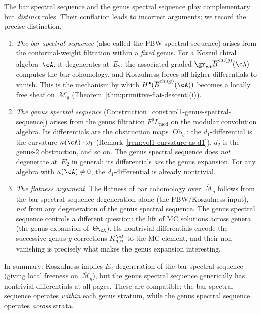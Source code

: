 \begin{remark}
\label{rem:two-spectral-sequences-clarification}
The bar spectral sequence and the genus spectral sequence play
complementary but \emph{distinct} roles.  Their conflation leads to
incorrect arguments; we record the precise distinction.

\begin{enumerate}[label=\textup{(\roman*)}]
\item \emph{The bar spectral sequence} (also called the PBW
  spectral sequence) arises from the conformal-weight filtration
  within a \emph{fixed} genus.  For a Koszul chiral algebra~$\cA$,
  it degenerates at~$E_2$: the associated graded
  $\gr_{\mathrm{wt}} \overline{B}^{\mathrm{ch},(g)}(\cA)$ computes
  the bar cohomology, and Koszulness forces all higher differentials
  to vanish.  This is the mechanism by which
  $H^\bullet(\overline{B}^{\mathrm{ch},(g)}(\cA))$ becomes a
  locally free sheaf on~$\overline{\mathcal{M}}_g$
  (Theorem~\ref{thm:primitive-flat-descent}\textup{(i)}).

\item \emph{The genus spectral sequence}
  (Construction~\ref{const:vol1-genus-spectral-sequence}) arises
  from the genus filtration $F^g L_{\mathrm{mod}}$ on the modular
  convolution algebra.  Its differentials are the obstruction maps
  $\operatorname{Ob}_g$: the $d_1$-differential is the curvature
  $\kappa(\cA) \cdot \omega_1$
  (Remark~\ref{rem:vol1-curvature-as-d1}), $d_2$ is the genus-$2$
  obstruction, and so on.  The genus spectral sequence does
  \emph{not} degenerate at~$E_2$ in general: its differentials
  \emph{are} the genus expansion.  For any algebra with
  $\kappa(\cA) \neq 0$, the $d_1$-differential is already
  nontrivial.

\item \emph{The flatness argument.}
  The flatness of bar cohomology over~$\overline{\mathcal{M}}_g$
  follows from the bar spectral sequence degeneration alone (the
  PBW/Koszulness input), \emph{not} from any degeneration of the
  genus spectral sequence.  The genus spectral sequence controls a
  different question: the lift of MC solutions across genera
  (the genus expansion of~$\Theta_\cA$).  Its nontrivial
  differentials encode the successive genus-$g$ corrections
  $K_{g,n}^\cA$ to the MC element, and their non-vanishing is
  precisely what makes the genus expansion interesting.
\end{enumerate}
\noindent
In summary: Koszulness implies $E_2$-degeneration of the bar
spectral sequence (giving local freeness on~$\overline{\mathcal{M}}_g$),
but the genus spectral sequence generically has nontrivial
differentials at all pages.  These are compatible: the bar spectral
sequence operates \emph{within} each genus stratum, while the genus
spectral sequence operates \emph{across} strata.
\end{remark}

